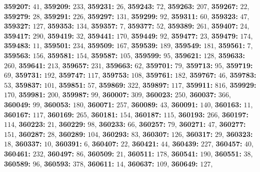 \textsf{\bfseries 359207:} $41$, \textsf{\bfseries 359209:} $233$, \textsf{\bfseries 359231:} $26$, \textsf{\bfseries 359243:} $72$, \textsf{\bfseries 359263:} $207$, \textsf{\bfseries 359267:} $22$, \textsf{\bfseries 359279:} $28$, \textsf{\bfseries 359291:} $226$, \textsf{\bfseries 359297:} $131$, \textsf{\bfseries 359299:} $92$, \textsf{\bfseries 359311:} $60$, \textsf{\bfseries 359323:} $47$, \textsf{\bfseries 359327:} $127$, \textsf{\bfseries 359353:} $134$, \textsf{\bfseries 359357:} $7$, \textsf{\bfseries 359377:} $52$, \textsf{\bfseries 359389:} $261$, \textsf{\bfseries 359407:} $24$, \textsf{\bfseries 359417:} $290$, \textsf{\bfseries 359419:} $32$, \textsf{\bfseries 359441:} $170$, \textsf{\bfseries 359449:} $92$, \textsf{\bfseries 359477:} $23$, \textsf{\bfseries 359479:} $174$, \textsf{\bfseries 359483:} $11$, \textsf{\bfseries 359501:} $234$, \textsf{\bfseries 359509:} $167$, \textsf{\bfseries 359539:} $189$, \textsf{\bfseries 359549:} $181$, \textsf{\bfseries 359561:} $7$, \textsf{\bfseries 359563:} $156$, \textsf{\bfseries 359581:} $154$, \textsf{\bfseries 359587:} $105$, \textsf{\bfseries 359599:} $95$, \textsf{\bfseries 359621:} $128$, \textsf{\bfseries 359633:} $260$, \textsf{\bfseries 359641:} $213$, \textsf{\bfseries 359657:} $231$, \textsf{\bfseries 359663:} $62$, \textsf{\bfseries 359701:} $79$, \textsf{\bfseries 359713:} $95$, \textsf{\bfseries 359719:} $69$, \textsf{\bfseries 359731:} $192$, \textsf{\bfseries 359747:} $117$, \textsf{\bfseries 359753:} $108$, \textsf{\bfseries 359761:} $182$, \textsf{\bfseries 359767:} $46$, \textsf{\bfseries 359783:} $53$, \textsf{\bfseries 359837:} $101$, \textsf{\bfseries 359851:} $57$, \textsf{\bfseries 359869:} $322$, \textsf{\bfseries 359897:} $117$, \textsf{\bfseries 359911:} $816$, \textsf{\bfseries 359929:} $170$, \textsf{\bfseries 359981:} $200$, \textsf{\bfseries 359987:} $99$, \textsf{\bfseries 360007:} $309$, \textsf{\bfseries 360023:} $250$, \textsf{\bfseries 360037:} $366$, \textsf{\bfseries 360049:} $99$, \textsf{\bfseries 360053:} $180$, \textsf{\bfseries 360071:} $257$, \textsf{\bfseries 360089:} $43$, \textsf{\bfseries 360091:} $140$, \textsf{\bfseries 360163:} $11$, \textsf{\bfseries 360167:} $117$, \textsf{\bfseries 360169:} $265$, \textsf{\bfseries 360181:} $154$, \textsf{\bfseries 360187:} $115$, \textsf{\bfseries 360193:} $266$, \textsf{\bfseries 360197:} $114$, \textsf{\bfseries 360223:} $21$, \textsf{\bfseries 360229:} $98$, \textsf{\bfseries 360233:} $66$, \textsf{\bfseries 360257:} $79$, \textsf{\bfseries 360271:} $47$, \textsf{\bfseries 360277:} $151$, \textsf{\bfseries 360287:} $28$, \textsf{\bfseries 360289:} $104$, \textsf{\bfseries 360293:} $83$, \textsf{\bfseries 360307:} $126$, \textsf{\bfseries 360317:} $29$, \textsf{\bfseries 360323:} $18$, \textsf{\bfseries 360337:} $10$, \textsf{\bfseries 360391:} $6$, \textsf{\bfseries 360407:} $22$, \textsf{\bfseries 360421:} $44$, \textsf{\bfseries 360439:} $227$, \textsf{\bfseries 360457:} $40$, \textsf{\bfseries 360461:} $232$, \textsf{\bfseries 360497:} $86$, \textsf{\bfseries 360509:} $21$, \textsf{\bfseries 360511:} $178$, \textsf{\bfseries 360541:} $190$, \textsf{\bfseries 360551:} $38$, \textsf{\bfseries 360589:} $96$, \textsf{\bfseries 360593:} $378$, \textsf{\bfseries 360611:} $14$, \textsf{\bfseries 360637:} $109$, \textsf{\bfseries 360649:} $127$, 
